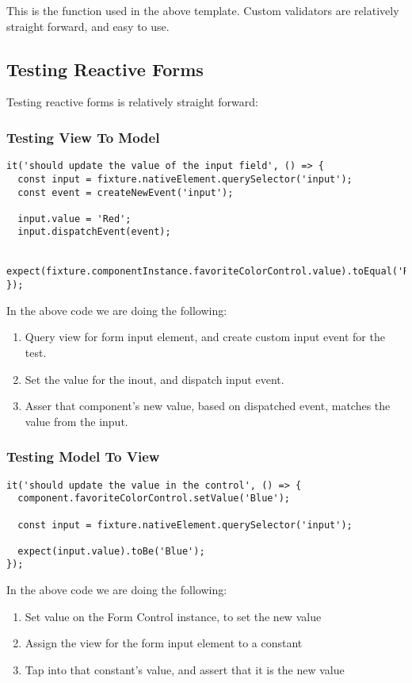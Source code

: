 This is the function used in the above template. Custom validators are 
relatively straight forward, and easy to use. 

\subsection{ Testing Reactive Forms }
Testing reactive forms is relatively straight forward: 

\subsubsection{ Testing View To Model }

\begin{lstlisting}[caption=Testing View to Model]
it('should update the value of the input field', () => {
  const input = fixture.nativeElement.querySelector('input');
  const event = createNewEvent('input');

  input.value = 'Red';
  input.dispatchEvent(event);

  expect(fixture.componentInstance.favoriteColorControl.value).toEqual('Red');
});
\end{lstlisting}

In the above code we are doing the following: 
\begin{enumerate}
  \item Query view for form input element, and create custom input event for
  the test.
  \item Set the value for the inout, and dispatch input event.
  \item Asser that component's new value, based on dispatched event, matches
  the value from the input. 
\end{enumerate}

\subsubsection{ Testing Model To View }

\begin{lstlisting}
it('should update the value in the control', () => {
  component.favoriteColorControl.setValue('Blue');

  const input = fixture.nativeElement.querySelector('input');

  expect(input.value).toBe('Blue');
});
\end{lstlisting}

In the above code we are doing the following: 
\begin{enumerate}
  \item Set value on the Form Control instance, to set the new value 
  \item Assign the view for the form input element to a constant
  \item Tap into that constant's value, and assert that it is the new value
\end{enumerate}


